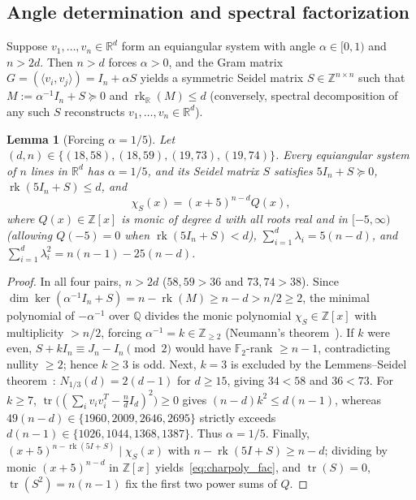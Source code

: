 \documentclass[11pt,reqno]{amsart}
\newtheorem{lemma}[theorem]{Lemma}
\theoremstyle{definition}
\theoremstyle{remark}
\DeclareMathOperator{\tr}{tr}
\DeclareMathOperator{\rk}{rk}
\begin{document}
\subsection{Angle determination and spectral factorization}
Suppose $v_1, \dots, v_n \in \mathbb{R}^d$ form an equiangular system with angle $\alpha \in [0, 1)$ and $n > 2d$. Then $n > d$ forces $\alpha > 0$, and the Gram matrix $G = (\langle v_i, v_j \rangle) = I_n + \alpha S$ yields a symmetric Seidel matrix $S \in \mathbb{Z}^{n \times n}$ such that $M := \alpha^{-1} I_n + S \succeq 0$ and $\rk_{\mathbb{R}}(M) \le d$ (conversely, spectral decomposition of any such $S$ reconstructs $v_1, \dots, v_n \in \mathbb{R}^d$).

\begin{lemma}[Forcing $\alpha = 1/5$]\label{lem:phase1}
Let $(d, n) \in \{(18, 58), (18, 59), (19, 73), (19, 74)\}$. Every equiangular system of $n$ lines in $\mathbb{R}^d$ has $\alpha = 1/5$, and its Seidel matrix $S$ satisfies $5I_n + S \succeq 0$, $\rk(5I_n + S) \le d$, and
\begin{equation}\label{eq:charpoly_fac}
  \chi_S(x) = (x + 5)^{n - d} Q(x),
\end{equation}
where $Q(x) \in \mathbb{Z}[x]$ is monic of degree $d$ with all roots real and in $[-5, \infty)$ (allowing $Q(-5) = 0$ when $\rk(5I_n + S) < d$), $\sum_{i=1}^d \lambda_i = 5(n - d)$, and $\sum_{i=1}^d \lambda_i^2 = n(n - 1) - 25(n - d)$.
\end{lemma}

\begin{proof}
In all four pairs, $n > 2d$ ($58, 59 > 36$ and $73, 74 > 38$). Since $\dim\ker(\alpha^{-1}I_n + S) = n - \rk(M) \ge n - d > n/2 \ge 2$, the minimal polynomial of $-\alpha^{-1}$ over $\mathbb{Q}$ divides the monic polynomial $\chi_S \in \mathbb{Z}[x]$ with multiplicity $> n/2$, forcing $\alpha^{-1} = k \in \mathbb{Z}_{\ge 2}$ (Neumann's theorem~\cite{LemmensSeidel1973}). If $k$ were even, $S + kI_n \equiv J_n - I_n \pmod 2$ would have $\mathbb{F}_2$-rank $\ge n - 1$, contradicting nullity $\ge 2$; hence $k \ge 3$ is odd. Next, $k = 3$ is excluded by the Lemmens--Seidel theorem~\cite{LemmensSeidel1973}: $N_{1/3}(d) = 2(d - 1)$ for $d \ge 15$, giving $34 < 58$ and $36 < 73$. For $k \ge 7$, $\tr\big((\sum_i v_i v_i^T - \frac{n}{d}I_d)^2\big) \ge 0$ gives $(n - d)k^2 \le d(n - 1)$, whereas $49(n - d) \in \{1960, 2009, 2646, 2695\}$ strictly exceeds $d(n - 1) \in \{1026, 1044, 1368, 1387\}$. Thus $\alpha = 1/5$. Finally, $(x + 5)^{n - \rk(5I+S)} \mid \chi_S(x)$ with $n - \rk(5I+S) \ge n - d$; dividing by monic $(x+5)^{n-d}$ in $\mathbb{Z}[x]$ yields~\eqref{eq:charpoly_fac}, and $\tr(S) = 0$, $\tr(S^2) = n(n - 1)$ fix the first two power sums of $Q$.
\end{proof}
\end{document}
